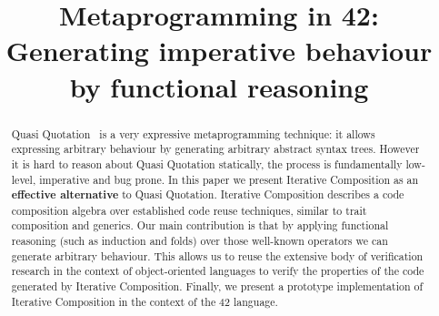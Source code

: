 \documentclass[runningheads]{llncs}
\begin{document}
%
\title{Metaprogramming in 42:
Generating imperative behaviour by functional reasoning}
%
%
%
%
%
\maketitle              %
%
\begin{abstract}
Quasi Quotation~\cite{moggi1999idealized,pitman1980special,sheard2002template} is a very expressive metaprogramming technique: it allows expressing arbitrary behaviour by
generating arbitrary abstract syntax trees.
However it is hard to reason about Quasi Quotation statically,
the process is fundamentally low-level, imperative and bug prone.
In this paper we present Iterative Composition as
an \textbf{effective alternative} to Quasi Quotation.
Iterative Composition describes a code composition algebra over established code reuse techniques,
similar to trait composition and generics.
Our main contribution is that by applying functional reasoning (such as induction and folds)
over those well-known operators we can generate arbitrary behaviour.
This allows us to reuse the extensive body of verification research in the 
context of object-oriented languages to verify the properties
of the code generated by Iterative Composition.
Finally, we present a prototype implementation of Iterative Composition in the context of the 42 language.


%
%
%


\end{abstract}
\end{document}
